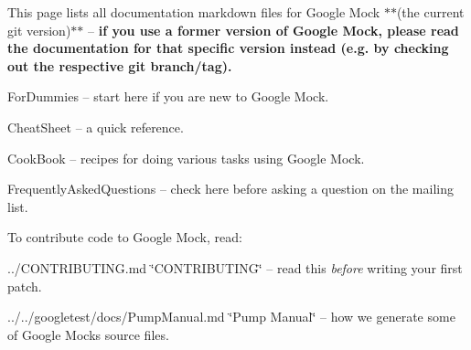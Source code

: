 This page lists all documentation markdown files for Google Mock $\ast$$\ast$(the current git version)$\ast$$\ast$ -- {\bfseries if you use a former version of Google Mock, please read the documentation for that specific version instead (e.\+g. by checking out the respective git branch/tag).}


\begin{DoxyItemize}
\item For\+Dummies -- start here if you are new to Google Mock.
\item Cheat\+Sheet -- a quick reference.
\item Cook\+Book -- recipes for doing various tasks using Google Mock.
\item Frequently\+Asked\+Questions -- check here before asking a question on the mailing list.
\end{DoxyItemize}

To contribute code to Google Mock, read\+:


\begin{DoxyItemize}
\item ../\+C\+O\+N\+T\+R\+I\+B\+U\+T\+I\+NG.md \char`\"{}\+C\+O\+N\+T\+R\+I\+B\+U\+T\+I\+N\+G\char`\"{} -- read this {\itshape before} writing your first patch.
\item ../../googletest/docs/\+Pump\+Manual.md \char`\"{}\+Pump Manual\char`\"{} -- how we generate some of Google Mock\textquotesingle{}s source files. 
\end{DoxyItemize}